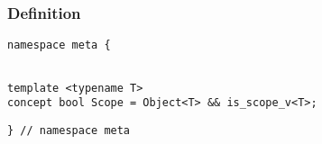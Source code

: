 
\subsubsection{Definition}

\begin{verbatim}
namespace meta {
\end{verbatim}
\begin{verbatim}

template <typename T>
concept bool Scope = Object<T> && is_scope_v<T>;

\end{verbatim}
\begin{verbatim}
} // namespace meta
\end{verbatim}
